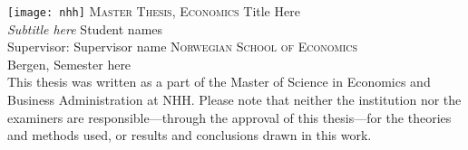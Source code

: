 \documentclass[../../main.tex]{subfiles}
\begin{document}
\begin{titlepage}
    \centering
    \texttt{[image: nhh]}
    \vfill
    \large{\textsc{Master Thesis, Economics}}    
    \vfill
    \Huge{Title Here}
    \\         
	\vspace{16pt}
    \large{\textit{Subtitle here}}
    \vfill        
    \large{Student names \\
    Supervisor: Supervisor name}    
    \vfill
    \vfill
    \normalsize
    \textsc{Norwegian School of Economics} \\
	Bergen, Semester here \\
	\vspace{16pt}
    This thesis was written as a part of the Master of Science in Economics and Business Administration at NHH. Please note that neither the institution nor the examiners are responsible---through the approval of this thesis---for the theories and methods used, or results and conclusions drawn in this work.
\end{titlepage}
\end{document}
